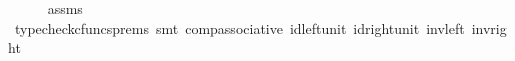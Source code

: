 \begin{isabellebody}
\ \ \ \ \isamarkupfalse%
\ assms\ \isamarkupfalse%
\ {\isacharparenleft}{\kern0pt}typecheck{\isacharunderscore}{\kern0pt}cfuncs{\isacharunderscore}{\kern0pt}prems{\isacharcomma}{\kern0pt}\ smt\ comp{\isacharunderscore}{\kern0pt}associative{}\ id{\isacharunderscore}{\kern0pt}left{\isacharunderscore}{\kern0pt}unit{}\ id{\isacharunderscore}{\kern0pt}right{\isacharunderscore}{\kern0pt}unit{}\ inv{\isacharunderscore}{\kern0pt}left\ inv{\isacharunderscore}{\kern0pt}right{\isacharparenright}{\kern0pt}\isanewline
{}\isamarkupfalse%
%
\endisatagproof
{\isafoldproof}%
%
\isadelimproof
\isanewline
%
\endisadelimproof
%
\isadelimtheory
\isanewline
%
\endisadelimtheory
%
\isatagtheory
{}\isamarkupfalse%
%
\endisatagtheory
{\isafoldtheory}%
%
\isadelimtheory
%
\endisadelimtheory
%
\end{isabellebody}%
\endinput
